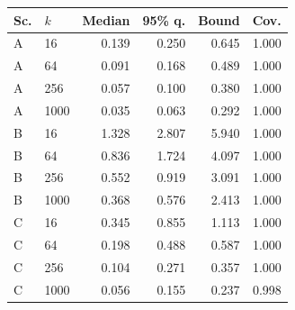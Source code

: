 \begin{tabular}{llrrrr}
\toprule
Sc. & $k$ & Median & 95\% q. & Bound & Cov. \\
\midrule
A & 16 & 0.139 & 0.250 & 0.645 & 1.000 \\
A & 64 & 0.091 & 0.168 & 0.489 & 1.000 \\
A & 256 & 0.057 & 0.100 & 0.380 & 1.000 \\
A & 1000 & 0.035 & 0.063 & 0.292 & 1.000 \\
B & 16 & 1.328 & 2.807 & 5.940 & 1.000 \\
B & 64 & 0.836 & 1.724 & 4.097 & 1.000 \\
B & 256 & 0.552 & 0.919 & 3.091 & 1.000 \\
B & 1000 & 0.368 & 0.576 & 2.413 & 1.000 \\
C & 16 & 0.345 & 0.855 & 1.113 & 1.000 \\
C & 64 & 0.198 & 0.488 & 0.587 & 1.000 \\
C & 256 & 0.104 & 0.271 & 0.357 & 1.000 \\
C & 1000 & 0.056 & 0.155 & 0.237 & 0.998 \\
\bottomrule
\end{tabular}
